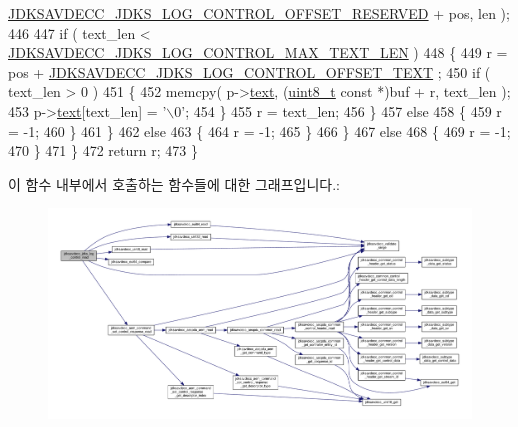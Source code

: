 \begin{DoxyCode}
      \hyperlink{group__jdks__log_gad860e4d61ae3f91cd3f9799e6b1dd3c5}{JDKSAVDECC\_JDKS\_LOG\_CONTROL\_OFFSET\_RESERVED} + pos, len );
446 
447                 \textcolor{keywordflow}{if} ( text\_len < \hyperlink{group__jdks__log_gaaa43d62d581d06b4c563a3ac9f689730}{JDKSAVDECC\_JDKS\_LOG\_CONTROL\_MAX\_TEXT\_LEN}
       )
448                 \{
449                     r = pos + \hyperlink{group__jdks__log_gaa3f2c42190fdfb5a9f8927254dcc38f0}{JDKSAVDECC\_JDKS\_LOG\_CONTROL\_OFFSET\_TEXT}
      ;
450                     \textcolor{keywordflow}{if} ( text\_len > 0 )
451                     \{
452                         memcpy( p->\hyperlink{group__jdks_ga77513c59b654d8ce1e07a7f3bcdf70db}{text}, (\hyperlink{stdint_8h_aba7bc1797add20fe3efdf37ced1182c5}{uint8\_t} \textcolor{keyword}{const} *)buf + r, text\_len );
453                         p->\hyperlink{group__jdks_ga77513c59b654d8ce1e07a7f3bcdf70db}{text}[text\_len] = \textcolor{charliteral}{'\(\backslash\)0'};
454                     \}
455                     r = text\_len;
456                 \}
457                 \textcolor{keywordflow}{else}
458                 \{
459                     r = -1;
460                 \}
461             \}
462             \textcolor{keywordflow}{else}
463             \{
464                 r = -1;
465             \}
466         \}
467         \textcolor{keywordflow}{else}
468         \{
469             r = -1;
470         \}
471     \}
472     \textcolor{keywordflow}{return} r;
473 \}
\end{DoxyCode}


이 함수 내부에서 호출하는 함수들에 대한 그래프입니다.\+:
\nopagebreak
\begin{figure}[H]
\begin{center}
\leavevmode
\includegraphics[width=350pt]{group__jdks__log_ga564507c73741faa269e846895bae6e16_cgraph}
\end{center}
\end{figure}




